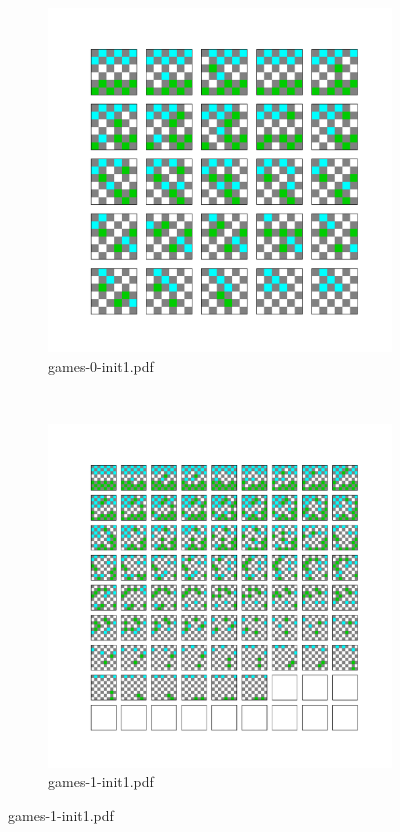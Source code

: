 \documentclass[9pt]{article}%
\begin{document}
\begin{figure}[ht!]
\vfill\eject
\begin{subfigure}{0.4\textwidth}
   \includegraphics[width=\textwidth]{games_0_init1.pdf}
   \caption{games-0-init1.pdf} 
   \end{subfigure}~
   \begin{subfigure}{0.4\textwidth}
   \includegraphics[width=\textwidth]{games_1_init1.pdf}
   \caption{games-1-init1.pdf}
   \end{subfigure}
\vfill\eject
\end{figure}
\end{document}
